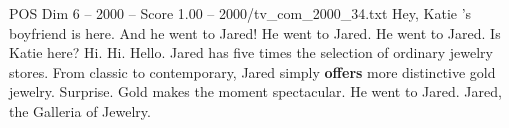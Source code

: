 \begin{textsample}{POS Dim 6 – 2000 – Score 1.00 – 2000/tv\_com\_2000\_34.txt}  \label{ex:f6_pos_090}
Hey, Katie 's boyfriend is here.
And he went to Jared!
He went to Jared.
He went to Jared.
Is Katie here?
Hi.
Hi.
Hello.
Jared has five times the selection of ordinary jewelry stores.
From classic to contemporary, Jared simply \textbf{offers} more distinctive gold jewelry.
Surprise.
Gold makes the moment spectacular.
He went to Jared.
Jared, the Galleria of Jewelry.

\end{textsample}
